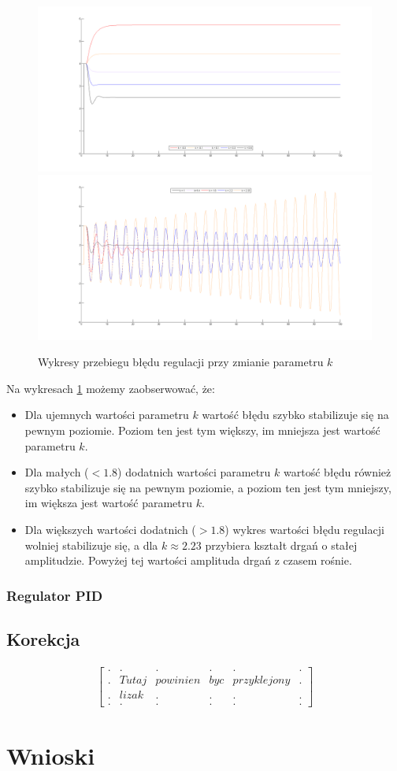 \documentclass[a4paper,10pt]{article}
\begin{document}
\begin{figure}[!h]
    \centering
	\includegraphics[width=120mm]{CW5-N3C2d1-k-03-06.png}
	\includegraphics[width=120mm]{CW5-N3C2d1-k1-225.png}
	\caption{Wykresy przebiegu błędu regulacji przy zmianie parametru $k$}
    \label{fig:symulacjaP}
\end{figure}

Na wykresach \ref{fig:symulacjaP} możemy zaobserwować, że:
\begin{itemize}
	\item Dla ujemnych wartości parametru $k$ wartość błędu szybko stabilizuje się na pewnym poziomie. Poziom ten jest tym większy, im mniejsza jest wartość parametru $k$.
	\item Dla małych ($<1.8$) dodatnich wartości parametru $k$ wartość błędu również szybko stabilizuje się na pewnym poziomie, a poziom ten jest tym mniejszy, im większa jest wartość parametru $k$.
	\item Dla większych wartości dodatnich ($>1.8$) wykres wartości błędu regulacji wolniej stabilizuje się, a dla $k \approx 2.23$ przybiera kształt drgań o stałej amplitudzie. Powyżej tej wartości amplituda drgań z czasem rośnie.
\end{itemize}

\subsubsection{Regulator PID}

\subsection{Korekcja}

\begin{eqnarray}
	\nonumber \left[ \begin{array}{llllll}
		. & . & . & . & . & . \\
		. & Tutaj & powinien & byc & przyklejony & . \\
		. & lizak & . & . & . & . \\
		. & . & . & . & . & .
	\end{array}\right]
\end{eqnarray}

\section{Wnioski}\label{sec:wnioski}
\end{document}
